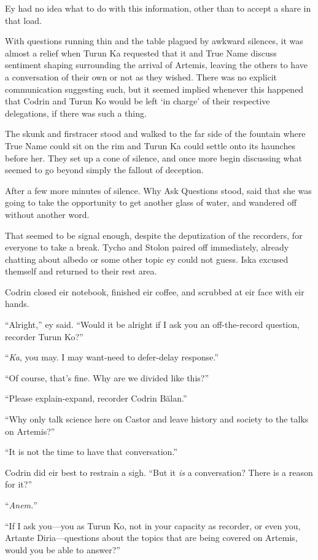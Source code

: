 Ey had no idea what to do with this information, other than to accept a share in that load.

With questions running thin and the table plagued by awkward silences, it was almost a relief when Turun Ka requested that it and True Name discuss sentiment shaping surrounding the arrival of Artemis, leaving the others to have a conversation of their own or not as they wished. There was no explicit communication suggesting such, but it seemed implied whenever this happened that Codrin and Turun Ko would be left `in charge' of their respective delegations, if there was such a thing.

The skunk and firstracer stood and walked to the far side of the fountain where True Name could sit on the rim and Turun Ka could settle onto its haunches before her. They set up a cone of silence, and once more begin discussing what seemed to go beyond simply the fallout of deception.

After a few more minutes of silence. Why Ask Questions stood, said that she was going to take the opportunity to get another glass of water, and wandered off without another word.

That seemed to be signal enough, despite the deputization of the recorders, for everyone to take a break. Tycho and Stolon paired off immediately, already chatting about albedo or some other topic ey could not guess. Iska excused themself and returned to their rest area.

Codrin closed eir notebook, finished eir coffee, and scrubbed at eir face with eir hands.

``Alright,'' ey said. ``Would it be alright if I ask you an off-the-record question, recorder Turun Ko?''

``\emph{Ka,} you may. I may want-need to defer-delay response.''

``Of course, that's fine. Why are we divided like this?''

``Please explain-expand, recorder Codrin Bălan.''

``Why only talk science here on Castor and leave history and society to the talks on Artemis?''

``It is not the time to have that conversation.''

Codrin did eir best to restrain a sigh. ``But it \emph{is} a conversation? There is a reason for it?''

``\emph{Anem.}''

``If I ask you—you as Turun Ko, not in your capacity as recorder, or even you, Artante Diria—questions about the topics that are being covered on Artemis, would you be able to answer?''

